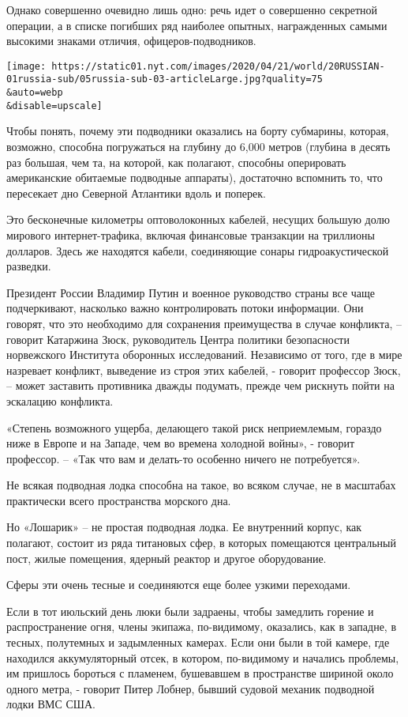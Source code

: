 Однако совершенно очевидно лишь одно: речь идет о совершенно секретной
операции, а в списке погибших ряд наиболее опытных, награжденных самыми
высокими знаками отличия, офицеров-подводников.

\texttt{[image: https://static01.nyt.com/images/2020/04/21/world/20RUSSIAN-01russia-sub/05russia-sub-03-articleLarge.jpg?quality=75\\\&auto=webp\\\&disable=upscale]}

Чтобы понять, почему эти подводники оказались на борту субмарины,
которая, возможно, способна погружаться на глубину до 6,000 метров
(глубина в десять раз большая, чем та, на которой, как полагают,
способны оперировать американские обитаемые подводные аппараты),
достаточно вспомнить то, что пересекает дно Северной Атлантики вдоль и
поперек.

Это бесконечные километры оптоволоконных кабелей, несущих большую долю
мирового интернет-трафика, включая финансовые транзакции на триллионы
долларов. Здесь же находятся кабели, соединяющие сонары
гидроакустической разведки.

Президент России Владимир Путин и военное руководство страны все чаще
подчеркивают, насколько важно контролировать потоки информации. Они
говорят, что это необходимо для сохранения преимущества в случае
конфликта, -- говорит Катаржина Зюск, руководитель Центра политики
безопасности норвежского Института оборонных исследований. Независимо от
того, где в мире назревает конфликт, выведение из строя этих кабелей, -
говорит профессор Зюск, -- может заставить противника дважды подумать,
прежде чем рискнуть пойти на эскалацию конфликта.

«Степень возможного ущерба, делающего такой риск неприемлемым, гораздо
ниже в Европе и на Западе, чем во времена холодной войны», - говорит
профессор. -- «Так что вам и делать-то особенно ничего не потребуется».

Не всякая подводная лодка способна на такое, во всяком случае, не в
масштабах практически всего пространства морского дна.

Но «Лошарик» -- не простая подводная лодка. Ее внутренний корпус, как
полагают, состоит из ряда титановых сфер, в которых помещаются
центральный пост, жилые помещения, ядерный реактор и другое
оборудование.

Сферы эти очень тесные и соединяются еще более узкими переходами.

Если в тот июльский день люки были задраены, чтобы замедлить горение и
распространение огня, члены экипажа, по-видимому, оказались, как в
западне, в тесных, полутемных и задымленных камерах. Если они были в той
камере, где находился аккумуляторный отсек, в котором, по-видимому и
начались проблемы, им пришлось бороться с пламенем, бушевавшем в
пространстве шириной около одного метра, - говорит Питер Лобнер, бывший
судовой механик подводной лодки ВМС США.

